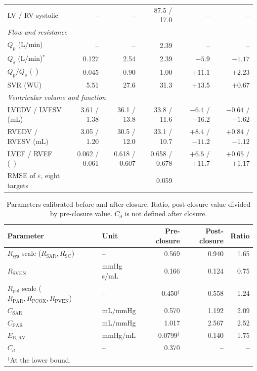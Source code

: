 \begin{table}[!htbp]
\begin{tabular}{lrrrrr}
LV / RV systolic & -- & -- & 87.5 / 17.0 & -- & -- \\
\multicolumn{6}{l}{\emph{Flow and resistance}} \\
$Q_p$ (L/min) & -- & -- & 2.39 & -- & -- \\
$Q_s$ (L/min)$^*$ & 0.127 & 2.54 & 2.39 & $-5.9$ & $-1.17$ \\
$Q_p/Q_s$ (--) & 0.045 & 0.90 & 1.00 & $+11.1$ & $+2.23$ \\
SVR (WU) & 5.51 & 27.6 & 31.3 & $+13.5$ & $+0.67$ \\
\multicolumn{6}{l}{\emph{Ventricular volume and function}} \\
LVEDV / LVESV (mL) & 3.61 / 1.38 & 36.1 / 13.8 & 33.8 / 11.6 & $-6.4$ / $-16.2$ & $-0.64$ / $-1.62$ \\
RVEDV / RVESV (mL) & 3.05 / 1.20 & 30.5 / 12.0 & 33.1 / 10.7 & $+8.4$ / $-11.2$ & $+0.84$ / $-1.12$ \\
LVEF / RVEF (--) & 0.062 / 0.061 & 0.618 / 0.607 & 0.658 / 0.678 & $+6.5$ / $+11.7$ & $+0.65$ / $+1.17$ \\
\midrule
RMSE of $\varepsilon$, eight targets & & & 0.059 & & \\
\bottomrule
\end{tabular}
\end{table}

\begin{table}[!htbp]
\centering\small
\caption{Parameters calibrated before and after closure. Ratio, post-closure value divided by pre-closure value. $C_d$ is not defined after closure.}
\label{tab:post_calib_params}
\begin{tabular}{llrrr}
\toprule
\textbf{Parameter} & \textbf{Unit} & \textbf{Pre-closure} & \textbf{Post-closure} & \textbf{Ratio} \\
\midrule
$R_\mathrm{sys}$ scale ($R_\mathrm{SAR}, R_\mathrm{SC}$) & -- & 0.569 & 0.940 & 1.65 \\
$R_\mathrm{SVEN}$ & mmHg\,s/mL & 0.166 & 0.124 & 0.75 \\
$R_\mathrm{pul}$ scale ($R_\mathrm{PAR}, R_\mathrm{PCOX}, R_\mathrm{PVEN}$) & -- & 0.450$^\dagger$ & 0.558 & 1.24 \\
$C_\mathrm{SAR}$ & mL/mmHg & 0.570 & 1.192 & 2.09 \\
$C_\mathrm{PAR}$ & mL/mmHg & 1.017 & 2.567 & 2.52 \\
$E_\mathrm{B,RV}$ & mmHg/mL & 0.0799$^\dagger$ & 0.140 & 1.75 \\
$C_d$ & -- & 0.370 & -- & -- \\
\bottomrule
\multicolumn{5}{l}{\footnotesize $^\dagger$At the lower bound.}
\end{tabular}
\end{table}



